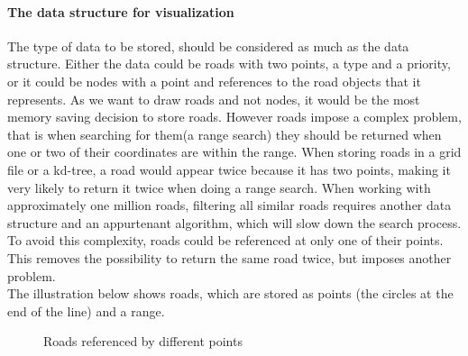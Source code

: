 \documentclass[a4paper,10pt,titlepage]{article}
\begin{document}
\paragraph{The data structure for visualization}

The type of data to be stored, should be considered as much as the data structure. Either the data could be roads with two points, a type and a priority, or it could be nodes with a point and references to the road objects that it represents. As we want to draw roads and not nodes, it would be the most memory saving decision to store roads. However roads impose a complex problem, that is when searching for them(a range search) they should be returned when one or two of their coordinates are within the range. When storing roads in a grid file or a kd-tree, a road would appear twice because it has two points, making it very likely to return it twice when doing a range search. When working with approximately one million roads, filtering all similar roads requires another data structure and an appurtenant algorithm, which will slow down the search process. To avoid this complexity, roads could be referenced at only one of their points. This removes the possibility to return the same road twice, but imposes another problem.\\
The illustration below shows roads, which are stored as points (the circles at the end of the line) and a range.

\begin{figure}[H]
\caption{Roads referenced by different points}
\label{fig:roads}
\end{figure}
\end{document}
